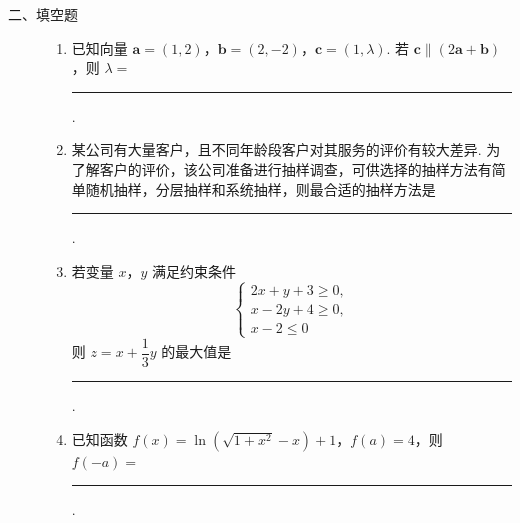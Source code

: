 \begin{description}

    \item[二、填空题]

    \begin{enumerate}[leftmargin=5pt]

      \addtocounter{enumi}{+12}

        \item 已知向量 \(\bm{a}=(1,2)\)，\(\bm{b}=(2,-2)\)，\(\bm{c}=(1,\lambda)\). 若 \(\bm{c}\parallel\left(2\bm{a}+\bm{b}\right)\)，则 \(\lambda=\)\rule[-0.3ex]{3em}{0.4pt}.

        \item 某公司有大量客户，且不同年龄段客户对其服务的评价有较大差异. 为了解客户的评价，该公司准备进行抽样调查，可供选择的抽样方法有简单随机抽样，分层抽样和系统抽样，则最合适的抽样方法是\rule[-0.3ex]{3em}{0.4pt}.

        \item 若变量 \(x\)，\(y\) 满足约束条件
\[
\begin{cases}

2x+y+3\ge0,\\
x-2y+4\ge0,\\
x-2\le0

\end{cases}
\]则 \(z=x+\dfrac13y\) 的最大值是\rule[-0.3ex]{3em}{0.4pt}.

        \item 已知函数 \(f(x)=\ln\!\left(\sqrt{1+x^2}-x\right)+1\)，\(f(a)=4\)，则 \(f(-a)=\)\rule[-0.3ex]{3em}{0.4pt}.

    \end{enumerate}

\end{description}

